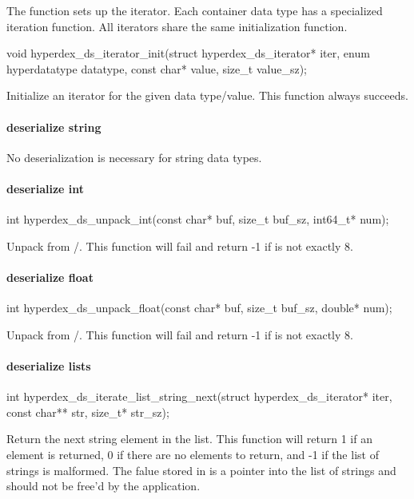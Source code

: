 The function  sets up the iterator.  Each
container data type has a specialized iteration function.  All iterators share
the same initialization function.

\begin{ccode}
void hyperdex_ds_iterator_init(struct hyperdex_ds_iterator* iter,
                               enum hyperdatatype datatype,
                               const char* value,
                               size_t value_sz);
\end{ccode}
Initialize an iterator for the given data type/value.  This function
always succeeds.

\paragraph{deserialize string}

No deserialization is necessary for string data types.

\paragraph{deserialize int}

\begin{ccode}
int hyperdex_ds_unpack_int(const char* buf, size_t buf_sz, int64_t* num);
\end{ccode}
Unpack  from /.  This function will
fail and return -1 if  is not exactly \unit{8}{\byte}.

\paragraph{deserialize float}

\begin{ccode}
int hyperdex_ds_unpack_float(const char* buf, size_t buf_sz, double* num);
\end{ccode}
Unpack  from /.  This function will
fail and return -1 if  is not exactly \unit{8}{\byte}.

\paragraph{deserialize lists}

\begin{ccode}
int hyperdex_ds_iterate_list_string_next(struct hyperdex_ds_iterator* iter,
                                         const char** str, size_t* str_sz);
\end{ccode}
Return the next string element in the list.  This function will return
1 if an element is returned, 0 if there are no elements to return, and -1 if the
list of strings is malformed.  The falue stored in  is a pointer into
the list of strings and should not be free'd by the application.

